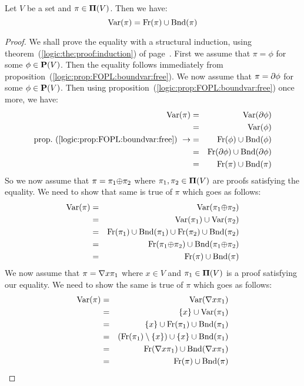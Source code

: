 \begin{prop}\label{logic:prop:FUAP:boundvarproof:var:free:bound}
Let $V$ be a set and $\pi\in\mbox{${\bf\Pi}(V)$}$. Then we have:
    \begin{equation}\label{logic:eqn:FUAP:boundvarproof:var:free:bound:1}
    \mbox{\rm Var}(\pi)=\mbox{\rm Fr}(\pi)\cup\mbox{\rm Bnd}(\pi)
    \end{equation}
\end{prop}
\begin{proof}
We shall prove the equality with a structural induction, using
theorem~(\ref{logic:the:proof:induction}) of
page~\pageref{logic:the:proof:induction}. First we assume that
$\pi=\phi$ for some $\phi\in\mbox{${\bf P}(V)$}$. Then the equality follows
immediately from proposition~(\ref{logic:prop:FOPL:boundvar:free}).
We now assume that $\pi=\mbox{$\partial$}\phi$ for some $\phi\in\mbox{${\bf P}(V)$}$.  Then using
proposition~(\ref{logic:prop:FOPL:boundvar:free}) once more, we
have:
    \begin{eqnarray*}
    \mbox{\rm Var}(\pi)&=&\mbox{\rm Var}(\mbox{$\partial$}\phi)\\
    &=&\mbox{\rm Var}(\phi)\\
    \mbox{prop.~(\ref{logic:prop:FOPL:boundvar:free})}\ \rightarrow
    &=&\mbox{\rm Fr}(\phi)\cup\mbox{\rm Bnd}(\phi)\\
    &=&\mbox{\rm Fr}(\mbox{$\partial$}\phi)\cup\mbox{\rm Bnd}(\mbox{$\partial$}\phi)\\
    &=&\mbox{\rm Fr}(\pi)\cup\mbox{\rm Bnd}(\pi)\\
    \end{eqnarray*}
So we now assume that $\pi=\pi_{1}\mbox{$\oplus$}\pi_{2}$ where
$\pi_{1},\pi_{2}\in\mbox{${\bf\Pi}(V)$}$ are proofs satisfying the equality. We need
to show that same is true of $\pi$ which goes as follows:
    \begin{eqnarray*}
    \mbox{\rm Var}(\pi)&=&\mbox{\rm Var}(\pi_{1}\mbox{$\oplus$}\pi_{2})\\
    &=&\mbox{\rm Var}(\pi_{1})\cup\mbox{\rm Var}(\pi_{2})\\
    &=&\mbox{\rm Fr}(\pi_{1})\cup\mbox{\rm Bnd}(\pi_{1})\cup\mbox{\rm Fr}(\pi_{2})\cup\mbox{\rm Bnd}(\pi_{2})\\
    &=&\mbox{\rm Fr}(\pi_{1}\mbox{$\oplus$}\pi_{2})\cup\mbox{\rm Bnd}(\pi_{1}\mbox{$\oplus$}\pi_{2})\\
    &=&\mbox{\rm Fr}(\pi)\cup\mbox{\rm Bnd}(\pi)\\
    \end{eqnarray*}
We now assume that $\pi=\mbox{$\nabla$} x\pi_{1}$ where $x\in V$ and
$\pi_{1}\in\mbox{${\bf\Pi}(V)$}$ is a proof satisfying our equality. We need to show
the same is true of $\pi$ which goes as follows:
    \begin{eqnarray*}
    \mbox{\rm Var}(\pi)&=&\mbox{\rm Var}(\mbox{$\nabla$} x\pi_{1})\\
    &=&\{x\}\cup\mbox{\rm Var}(\pi_{1})\\
    &=&\{x\}\cup\mbox{\rm Fr}(\pi_{1})\cup\mbox{\rm Bnd}(\pi_{1})\\
    &=&(\mbox{\rm Fr}(\pi_{1})\setminus\{x\})\cup\{x\}\cup\mbox{\rm Bnd}(\pi_{1})\\
    &=&\mbox{\rm Fr}(\mbox{$\nabla$} x\pi_{1})\cup\mbox{\rm Bnd}(\mbox{$\nabla$} x\pi_{1})\\
    &=&\mbox{\rm Fr}(\pi)\cup\mbox{\rm Bnd}(\pi)
    \end{eqnarray*}
\end{proof}

